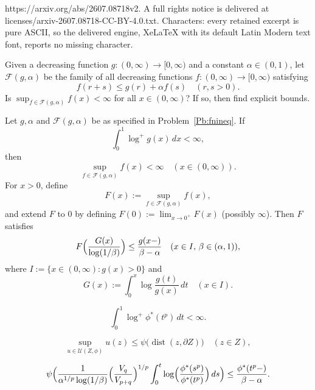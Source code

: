 \documentclass[10pt,a4paper]{amsart}
\DeclareMathOperator{\dist}{dist}
\newcommand{\cF}{\mathcal{F}}
\newcommand{\cU}{\mathcal{U}}
\begin{document}
https://arxiv.org/abs/2607.08718v2. A full rights notice is delivered at licenses/arxiv-2607.08718-CC-BY-4.0.txt. Characters: every retained excerpt is pure ASCII, so the delivered engine, XeLaTeX with its default Latin Modern text font, reports no missing character.
\begin{problem}\label{Pb:fnineq}
Given a decreasing function $g:(0,\infty)\to[0,\infty)$  
and a constant $\alpha\in(0,1)$, let $\cF(g,\alpha)$ be the family of all 
decreasing functions
 $f:(0,\infty)\to[0,\infty)$
satisfying
\begin{equation}\label{E:fnineq}
f(r+s)\le g(r)+\alpha f(s) \quad(r,s>0).
\end{equation}
Is $\sup_{f\in\cF(g,\alpha)}f(x)<\infty$ for all $x\in(0,\infty)$? 
If so, then find explicit bounds.
\end{problem}

\begin{theorem}\label{T:main}
Let $g,\alpha$ and $\cF(g,\alpha)$ be as specified in Problem~\ref{Pb:fnineq}.
If
\begin{equation}\label{E:nc}
\int_0^1 \log^+g(x)\,dx<\infty,
\end{equation}
then
\begin{equation}\label{E:supfinite}
\sup_{f\in\cF(g,\alpha)}f(x)<\infty \quad(x\in(0,\infty)).
\end{equation}
For $x>0$, define 
\[
F(x):=\sup_{f\in\cF(g,\alpha)}f(x),
\]
and extend $F$ to $0$ by defining  $F(0):=\lim_{x\to0^+}F(x)$ (possibly $\infty$).
Then $F$ satisfies
\begin{equation}\label{E:mainineq}
F\Bigl(\frac{G(x)}{\log(1/\beta)}\Bigr)
\le \frac{g(x-)}{\beta-\alpha}\quad(x\in I,\,\beta\in(\alpha,1)),
\end{equation}
where $I:=\{x\in(0,\infty):g(x)>0\}$ and
\begin{equation}\label{E:Gdef}
G(x):=\int_0^x \log\frac{g(t)}{g(x)}\,dt \quad(x\in I).
 \end{equation}
\end{theorem}

\begin{equation}\label{E:phiint}
 \int_0^1 \log^+\phi^*(t^p)\,dt<\infty.
\end{equation}

\begin{equation}\label{E:Ubound}
\sup_{u\in\cU(Z,\phi)}u(z)\le \psi\bigl(\dist(z,\partial Z)\bigr) \quad(z\in Z),
\end{equation}

\begin{equation}\label{E:Domarineq}
\psi\Bigl(\frac{1}{\alpha^{1/p}\log(1/\beta)}\Bigl(\frac{V_q}{V_{p+q}}\Bigr)^{1/p}
\int_0^t \log\Bigl(\frac{\phi^*(s^p)}{\phi^*(t^p)}\Bigr)\,ds\Bigr)
\le \frac{\phi^*(t^p-)}{\beta-\alpha}.
\end{equation}
\end{document}
